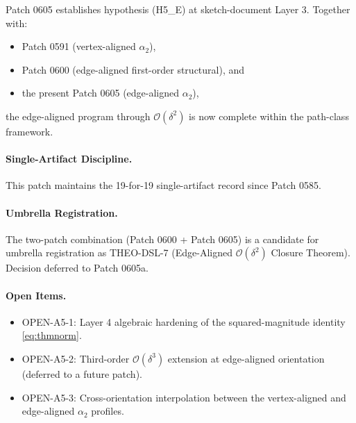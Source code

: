 \documentclass[11pt]{article}
\begin{document}
Patch 0605 establishes hypothesis (H5\_E) at sketch-document Layer 3.
Together with:
\begin{itemize}
\item Patch 0591 (vertex-aligned $\alpha_2$),
\item Patch 0600 (edge-aligned first-order structural), and
\item the present Patch 0605 (edge-aligned $\alpha_2$),
\end{itemize}
the edge-aligned program through $\mathcal{O}(\delta^2)$ is now complete
within the path-class framework.

\paragraph{Single-Artifact Discipline.}
This patch maintains the 19-for-19 single-artifact record since Patch 0585.

\paragraph{Umbrella Registration.}
The two-patch combination (Patch 0600 + Patch 0605) is a candidate for
umbrella registration as THEO-DSL-7 (Edge-Aligned $\mathcal{O}(\delta^2)$
Closure Theorem). Decision deferred to Patch 0605a.

\paragraph{Open Items.}
\begin{itemize}
\item OPEN-A5-1: Layer 4 algebraic hardening of the squared-magnitude
identity \eqref{eq:thmnorm}.
\item OPEN-A5-2: Third-order $\mathcal{O}(\delta^3)$ extension at
edge-aligned orientation (deferred to a future patch).
\item OPEN-A5-3: Cross-orientation interpolation between the
vertex-aligned and edge-aligned $\alpha_2$ profiles.
\end{itemize}
\end{document}
